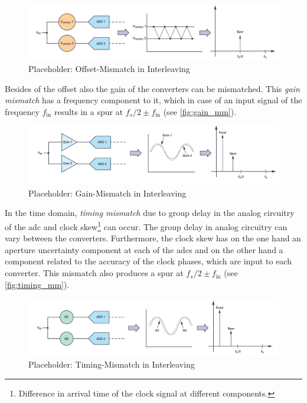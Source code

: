 \begin{figure}[tbh]
	\centering
	\includegraphics[width = \textwidth]{chap/02-theory/img/offset_mm}
	\caption{Placeholder: Offset-Mismatch in Interleaving \cite{Harris2019}}
	\label{fig:offset_mm}
\end{figure}

Besides of the offset also the gain of the converters can be mismatched. 
This \textit{gain mismatch} has a frequency component to it, which in case of an input signal of the frequency $f_{\text{in}}$ results in a spur at $f_s/2 \pm f_{\text{in}}$ (see \autoref{fig:gain_mm}). \cite{Harris2019}

\begin{figure}[tbh]
	\centering
	\includegraphics[width = \textwidth]{chap/02-theory/img/gain_mm}
	\caption{Placeholder: Gain-Mismatch in Interleaving \cite{Harris2019}}
	\label{fig:gain_mm}
\end{figure}

In the time domain, \textit{timing mismatch} due to group delay in the analog circuitry of the \gls{adc} and clock skew\footnote{Difference in arrival time of the clock signal at different components.} can occur. 
The group delay in analog circuitry can vary between the converters. 
Furthermore, the clock skew has on the one hand an aperture uncertainty component at each of the \glspl{adc} and on the other hand a component related to the accuracy of the clock phases, which are input to each converter. \cite{Harris2019} 
This mismatch also produces a spur at $f_s/2 \pm f_{\text{in}}$ (see \autoref{fig:timing_mm}).

\begin{figure}[tbh]
	\centering
	\includegraphics[width = \textwidth]{chap/02-theory/img/timing_mm}
	\caption{Placeholder: Timing-Mismatch in Interleaving \cite{Harris2019}}
	\label{fig:timing_mm}
\end{figure}

